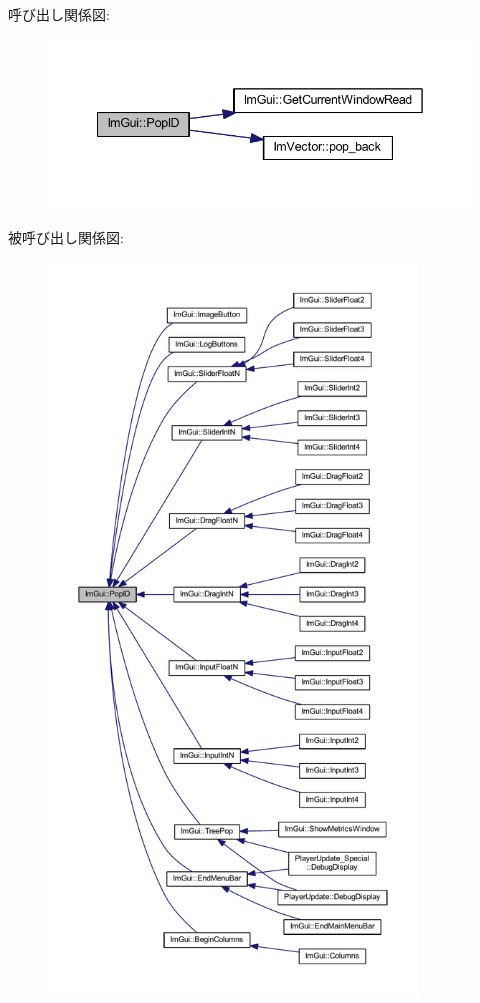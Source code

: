呼び出し関係図\+:\nopagebreak
\begin{figure}[H]
\begin{center}
\leavevmode
\includegraphics[width=342pt]{namespace_im_gui_aba0b2d8f890a5d435ae43d0c4a2d4dd1_cgraph}
\end{center}
\end{figure}
被呼び出し関係図\+:\nopagebreak
\begin{figure}[H]
\begin{center}
\leavevmode
\includegraphics[height=550pt]{namespace_im_gui_aba0b2d8f890a5d435ae43d0c4a2d4dd1_icgraph}
\end{center}
\end{figure}
\mbox{\label{namespace_im_gui_aa93281155e1dd23715dbd384e91edc6b}} 
